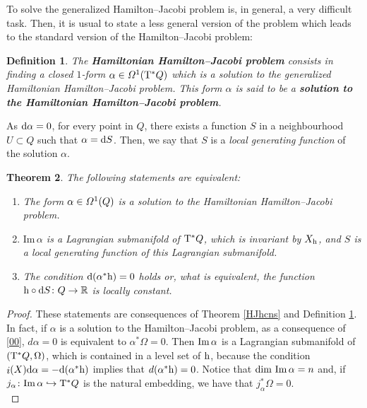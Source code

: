 \documentclass[12pt]{report}
\newtheorem{teor}{Theorem}[chapter]
\newtheorem{definition}[teor]{Definition}
\def\qed{\ifvmode\removelastskip\fi
{\unskip\nobreak\hfil\penalty50\hbox{}\nobreak\hfil
\hbox{\vrule height1.2ex width1.2ex}\parfillskip=0pt
\finalhyphendemerits=0 \par\smallskip}}
\def\df{{\mit\Omega}}
\def\d{{\rm d}}
\def\Real{\mathbb{R}}
\def\Tan{{\rm T}}
\def\inn{\mathop{i}\nolimits}
\begin{document}
To solve the generalized Hamilton--Jacobi problem is, in general, a very difficult task. 
Then, it is usual to state a less general version of the problem
which leads to the standard version of the Hamilton--Jacobi problem:

\begin{definition}
\label{HJh}
The \textbf{Hamiltonian Hamilton--Jacobi problem}
consists in finding a closed $1$-form $\alpha\in\df^1(\Tan^*Q)$
which is a solution to the generalized Hamiltonian Hamilton--Jacobi problem.
This form  $\alpha$ is said to be a \textbf{solution to the Hamiltonian Hamilton--Jacobi problem}.
\end{definition}

As $\d\alpha=0$, for every point in $Q$,
there exists a function $S$ in  a neighbourhood $U\subset Q$
such that $\alpha=\d S$.
Then, we say that $S$ is a {\sl local generating function} of the solution $\alpha$.

\begin{teor}
\label{cnsh}
The following statements are equivalent:
\begin{enumerate}
\item
The form  $\alpha\in\df^1(Q)$ is a solution to the Hamiltonian Hamilton--Jacobi problem.
\item
$\mathrm{Im}\,\alpha$ is a Lagrangian submanifold of
$\Tan^*Q$, which is invariant by $X_{\rm h}$,
and $S$ is a local generating function of this Lagrangian submanifold.
\item
The condition  $\d(\alpha^*{\rm h})=0$ holds
or, what is equivalent, the function
${\rm h}\circ\d S\colon Q\to\Real$ is locally constant.
\end{enumerate}
\end{teor}
\begin{proof}
These statements are consequences of Theorem \ref{HJhcns} and Definition \ref{HJh}.
In fact, if $\alpha$ is a solution to the Hamilton--Jacobi problem, 
as a consequence of \eqref{00},
$d\alpha=0$ is equivalent to $\alpha^*\Omega=0$. Then
${\rm Im}\,\alpha$ is a Lagrangian submanifold of $(\Tan^*Q,\Omega)$, 
which is contained in a level set of
${\rm h}$, because the condition $\inn(X)\d\alpha=-\d(\alpha^*{\rm h})$ 
implies that $d(\alpha^*{\rm h})=0$.
Notice that $\dim\,{\rm Im}\,\alpha=n$ and,
if $j_\alpha\colon{\rm Im}\,\alpha\hookrightarrow \Tan^*Q$
is the natural embedding, we have that $j_\alpha^*\Omega=0$.
\\ \qed \end{proof}
\end{document}
